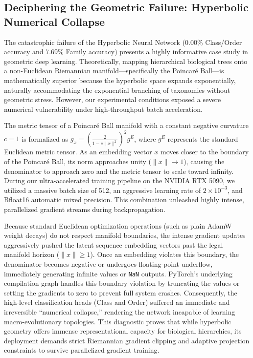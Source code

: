 \documentclass[11pt,a4paper]{article}
\begin{document}
\subsection{Deciphering the Geometric Failure: Hyperbolic Numerical Collapse}
The catastrophic failure of the Hyperbolic Neural Network (0.00\% Class/Order accuracy and 7.69\% Family accuracy) presents a highly informative case study in geometric deep learning. Theoretically, mapping hierarchical biological trees onto a non-Euclidean Riemannian manifold—specifically the Poincaré Ball—is mathematically superior because the hyperbolic space expands exponentially, naturally accommodating the exponential branching of taxonomies without geometric stress. However, our experimental conditions exposed a severe numerical vulnerability under high-throughput batch acceleration.

The metric tensor of a Poincaré Ball manifold with a constant negative curvature $c=1$ is formalized as $g_x = \left(\frac{2}{1 - c\|x\|^2}\right)^2 g^E$, where $g^E$ represents the standard Euclidean metric tensor. As an embedding vector $x$ moves closer to the boundary of the Poincaré Ball, its norm approaches unity ($\|x\| \to 1$), causing the denominator to approach zero and the metric tensor to scale toward infinity. During our ultra-accelerated training pipeline on the NVIDIA RTX 5090, we utilized a massive batch size of 512, an aggressive learning rate of $2 \times 10^{-3}$, and Bfloat16 automatic mixed precision. This combination unleashed highly intense, parallelized gradient streams during backpropagation.

Because standard Euclidean optimization operations (such as plain AdamW weight decays) do not respect manifold boundaries, the intense gradient updates aggressively pushed the latent sequence embedding vectors past the legal manifold horizon ($\|x\| \ge 1$). Once an embedding violates this boundary, the denominator becomes negative or undergoes floating-point underflow, immediately generating infinite values or \texttt{NaN} outputs. PyTorch's underlying compilation graph handles this boundary violation by truncating the values or setting the gradients to zero to prevent full system crashes. Consequently, the high-level classification heads (Class and Order) suffered an immediate and irreversible ``numerical collapse,'' rendering the network incapable of learning macro-evolutionary topologies. This diagnostic proves that while hyperbolic geometry offers immense representational capacity for biological hierarchies, its deployment demands strict Riemannian gradient clipping and adaptive projection constraints to survive parallelized gradient training.
\end{document}
